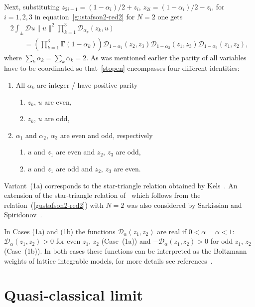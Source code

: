 \documentclass[pdftex]{sigma}
\numberwithin{equation}{section}
\begin{document}
Next, substituting $z_{2i-1}=(1-\alpha_i)/2+z_i$, $z_{2i}=(1-\alpha_i)/2-z_i$, for $i=1,2,3$ in equation~\eqref{gustafson2-red2} for $N=2$ one gets
\begin{gather}
2\int_\pm \mathcal{D} u \|u\|^2 \prod_{k=1}^3 \boldsymbol{\mathcal D}_{\alpha_k}(z_k,u) \nonumber\\
\qquad{} = \left(\prod_{k=1}^3 \boldsymbol \Gamma(1-\alpha_k)\right)
\boldsymbol{\mathcal D}_{1-\alpha_1}(z_2,z_3) \boldsymbol{\mathcal D}_{1-\alpha_2}(z_1,z_3)
\boldsymbol{\mathcal D}_{1-\alpha_3}(z_1,z_2), \label{stopen}
\end{gather}
where $\sum_k\alpha_k=\sum_k\bar\alpha_k=2$. As was mentioned earlier the parity of all variables have to be coordinated so that~\eqref{stopen} encompasses four different identities:
\begin{enumerate}\itemsep=0pt
\item[(1)] All $\alpha_k$ are integer / have positive parity
\begin{enumerate}\itemsep=0pt
\item[(a)] $z_k$, $u$ are even,
\item[(b)] $ z_k$, $u$ are odd,
\end{enumerate}
\item[(2)] $\alpha_1$ and $\alpha_2$, $\alpha_3$ are even and odd, respectively
\begin{enumerate}\itemsep=0pt
\item[(a)] $u$ and $z_1$ are even and $z_2$, $z_3$ are odd,
\item[(b)] $u$ and $z_1$ are odd and $z_2$, $z_3$ are even.
\end{enumerate}
\end{enumerate}
Variant~(1a) corresponds to the star-triangle relation obtained by Kels~\cite[equation~(17)]{Kels:2013ola}. An extension of the star-triangle relation of~\cite{Kels:2013ola} which follows from the relation~(\ref{gustafson2-red2}) with $N=2$ was also considered by Sarkissian and Spiridonov~\cite{Spir}.

In Cases (1a) and (1b) the functions $\boldsymbol {\mathcal D}_\alpha(z_1,z_2)$ are real if $0<\alpha=\bar\alpha<1$: $\boldsymbol {\mathcal D}_\alpha(z_1,z_2) >0$ for even $z_1$, $z_2$ (Case~(1a)) and $-\boldsymbol {\mathcal D}_\alpha(z_1,z_2) >0$ for odd $z_1$, $z_2$ (Case~(1b)). In both cases these functions can be interpreted as the Boltzmann weights of lattice integrable models, for more details see references~\cite{Kels:2013ola,Kels:2015bda}.

\section{Quasi-classical limit}\label{section:quasi}
\end{document}
